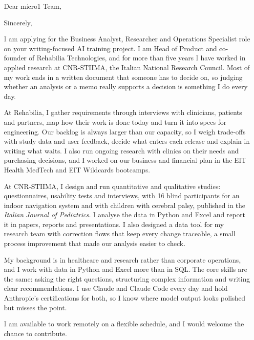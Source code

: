 \documentclass[11pt,a4paper,sans]{moderncv}
\begin{document}

\opening{Dear micro1 Team,}
\closing{Sincerely,}
\makelettertitle

I am applying for the Business Analyst, Researcher and Operations Specialist role on your writing-focused AI training project. I am Head of Product and co-founder of Rehabilia Technologies, and for more than five years I have worked in applied research at CNR-STIIMA, the Italian National Research Council. Most of my work ends in a written document that someone has to decide on, so judging whether an analysis or a memo really supports a decision is something I do every day.

At Rehabilia, I gather requirements through interviews with clinicians, patients and partners, map how their work is done today and turn it into specs for engineering. Our backlog is always larger than our capacity, so I weigh trade-offs with study data and user feedback, decide what enters each release and explain in writing what waits. I also run ongoing research with clinics on their needs and purchasing decisions, and I worked on our business and financial plan in the EIT Health MedTech and EIT Wildcards bootcamps.

At CNR-STIIMA, I design and run quantitative and qualitative studies: questionnaires, usability tests and interviews, with 16 blind participants for an indoor navigation system and with children with cerebral palsy, published in the \textit{Italian Journal of Pediatrics}. I analyse the data in Python and Excel and report it in papers, reports and presentations. I also designed a data tool for my research team with correction flows that keep every change traceable, a small process improvement that made our analysis easier to check.

My background is in healthcare and research rather than corporate operations, and I work with data in Python and Excel more than in SQL. The core skills are the same: asking the right questions, structuring complex information and writing clear recommendations. I use Claude and Claude Code every day and hold Anthropic's certifications for both, so I know where model output looks polished but misses the point.

I am available to work remotely on a flexible schedule, and I would welcome the chance to contribute.

\makeletterclosing
\end{document}
